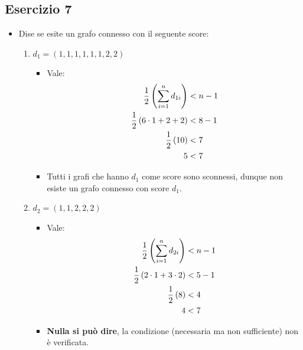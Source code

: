 \documentclass[10pt]{article}
\begin{document}
	\subsection{Esercizio 7}
	\begin{itemize}
	\item
	Dise se esite un grafo connesso con il seguente score:
	\begin{enumerate}
	\item
	$d_1 = (1,1,1,1,1,1,2,2)$
	\begin{itemize}
	\item
	Vale:
	\begin{equation}
	\begin{split}
	\frac{1}{2} \left(\sum_{i = 1}^{n} d_{1i} \right) &< n - 1 \\
	\frac{1}{2} \left(6 \cdot 1 + 2 + 2\right) &< 8 - 1 \\
	\frac{1}{2} \left(10\right) &< 7 \\
	5 &< 7
	\notag
	\end{split}
	\end{equation}
	\item
	Tutti i grafi che hanno $d_1$ come score sono sconnessi, dunque non esiste un grafo connesso con score $d_1$.
	\end{itemize}
	\item
	$d_2 = (1,1,2,2,2)$
	\begin{itemize}
	\item
	Vale:
	\begin{equation}
	\begin{split}
	\frac{1}{2} \left(\sum_{i = 1}^{n} d_{2i} \right) &< n - 1 \\
	\frac{1}{2} \left(2 \cdot 1 + 3 \cdot  2\right) &< 5 - 1 \\
	\frac{1}{2} \left(8\right) &< 4 \\
	4 &< 7
	\notag
	\end{split}
	\end{equation}
	\item
	\textbf{Nulla si può dire}, la condizione (necessaria ma non sufficiente) non è verificata.
	\end{itemize}
	\end{enumerate}
	\end{itemize}
	
\end{document}
